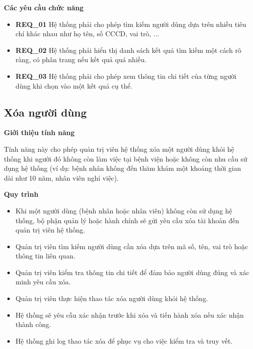 \noindent \textbf{Các yêu cầu chức năng}

\begin{itemize}

    \item \textbf{REQ\_01} Hệ thống phải cho phép tìm kiếm người dùng dựa trên nhiều tiêu chí khác nhau như họ tên, số CCCD, vai trò, ...

    \item \textbf{REQ\_02} Hệ thống phải hiển thị danh sách kết quả tìm kiếm một cách rõ ràng, có phân trang nếu kết quả quá nhiều.

    \item \textbf{REQ\_03} Hệ thống phải cho phép xem thông tin chi tiết của từng người dùng khi chọn vào một kết quả cụ thể.

\end{itemize}

\subsection{Xóa người dùng}

\noindent \textbf{Giới thiệu tính năng}

Tính năng này cho phép quản trị viên hệ thống xóa một người dùng khỏi hệ thống khi người đó không còn làm việc tại bệnh viện hoặc không còn nhu cầu sử dụng hệ thống (ví dụ: bệnh nhân không đến thăm khám một khoảng thời gian dài như 10 năm, nhân viên nghỉ việc).

\noindent \textbf{Quy trình}

\begin{itemize}

    \item Khi một người dùng (bệnh nhân hoặc nhân viên) không còn sử dụng hệ thống, bộ phận quản lý hoặc hành chính sẽ gửi yêu cầu xóa tài khoản đến quản trị viên hệ thống.

    \item Quản trị viên tìm kiếm người dùng cần xóa dựa trên mã số, tên, vai trò hoặc thông tin liên quan.

    \item Quản trị viên kiểm tra thông tin chi tiết để đảm bảo người dùng đúng và xác minh yêu cầu xóa.

    \item Quản trị viên thực hiện thao tác xóa người dùng khỏi hệ thống.

    \item Hệ thống sẽ yêu cầu xác nhận trước khi xóa và tiến hành xóa nếu xác nhận thành công.

    \item Hệ thống ghi log thao tác xóa để phục vụ cho việc kiểm tra và truy vết.

\end{itemize}


